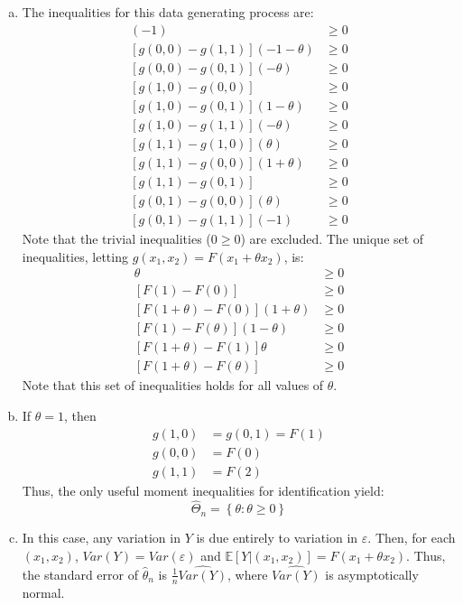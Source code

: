 \documentclass{article}
\newcommand{\that}{\hat{\theta}_n}
\newcommand{\E}[1]{\mathbb{E}\left[#1\right]}%
\begin{document}
\begin{enumerate}[(a)]
    \item The inequalities for this data generating process are:\begin{align*}
        [g(0, 0) - g(1, 0)](-1)         &\geq 0 \\
        [g(0, 0) - g(1, 1)](-1 -\theta) &\geq 0 \\
        [g(0, 0) - g(0, 1)](- \theta)   &\geq 0 \\
        [g(1, 0) - g(0, 0)]             &\geq 0 \\
        [g(1, 0) - g(0, 1)](1 - \theta) &\geq 0 \\
        [g(1, 0) - g(1, 1)](- \theta)   &\geq 0 \\
        [g(1, 1) - g(1, 0)](\theta)     &\geq 0 \\
        [g(1, 1) - g(0, 0)](1 + \theta) &\geq 0 \\
        [g(1, 1) - g(0, 1)]             &\geq 0 \\
        [g(0, 1) - g(0, 0)](\theta)     &\geq 0 \\
        [g(0, 1) - g(1, 1)](-1)         &\geq 0 
    \end{align*}
    Note that the trivial inequalities ($0\geq 0$) are excluded. The unique set of inequalities, letting $g(x_1, x_2) = F(x_1 + \theta x_2)$, is:\begin{align}
        [F(\theta) - F(0)]\theta            &\geq 0 \\
        [F(1) - F(0)]                       &\geq 0 \\
        [F(1+\theta) - F(0)](1 + \theta)    &\geq 0 \\
        [F(1) - F(\theta)](1 - \theta)      &\geq 0 \\
        [F(1+\theta) - F(1)]\theta          &\geq 0 \\
        [F(1+\theta) - F(\theta)]           &\geq 0 
    \end{align}
    Note that this set of inequalities holds for all values of $\theta$. 

    \item If $\theta=1$, then\begin{align*}
        g(1, 0) &= g(0, 1) = F(1)  \\
        g(0, 0) &= F(0)            \\
        g(1, 1) &= F(2)
    \end{align*}
    Thus, the only useful moment inequalities for identification yield:\[
        \hat{\Theta}_n = \left\{\theta: \theta\geq0\right\}
    \]

    \item In this case, any variation in $Y$ is due entirely to variation in $\varepsilon$. Then, for each $(x_1, x_2)$, $Var(Y) = Var(\varepsilon)$ and $\E{Y|(x_1, x_2)} = F(x_1 + \theta x_2)$. Thus, the standard error of $\that$ is $\frac{1}{n}\widehat{Var(Y)}$, where $\widehat{Var(Y)}$ is asymptotically normal.
\end{enumerate}

\end{document}
